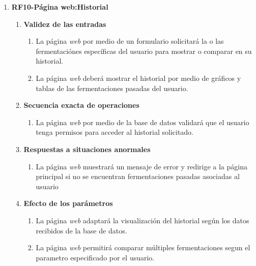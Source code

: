 \begin{enumerate}
            \item \label{it:RF10} \textbf{RF10-Página web:Historial}
        \begin{enumerate}
                \item \textbf{Validez de las entradas}
                    \begin{enumerate}
                        \item La página \textit{web}  por medio de un formulario solicitará la o las fermentaciónes específicas del usuario para mostrar o comparar en su historial.
                        \item La página \textit{web} deberá mostrar el historial por medio de gráficos y tablas de las fermentaciones pasadas del usuario.
                    \end{enumerate}   
                
                \item \textbf{Secuencia exacta de operaciones}
                    \begin{enumerate}
                        \item La página \textit{web} por medio de la base de datos validará que el usuario tenga permisos para acceder al historial solicitado.
                    \end{enumerate}   
            
                \item \textbf{Respuestas a situaciones anormales}
                    \begin{enumerate}
                        \item La página \textit{web} muestrará un mensaje de error y redirige a la página principal si no se encuentran fermentaciones pasadas asociadas al usuario
                    \end{enumerate}   
        
                \item \textbf{Efecto de los parámetros}
                    \begin{enumerate}
                        \item La página \textit{web} adaptará la visualización del historial según los datos recibidos de la base de datos.
                        \item La página \textit{web} permitirá comparar múltiples fermentaciones segun el parametro especificado por el usuario.
                    \end{enumerate}   
            

\end{enumerate}
\end{enumerate}
